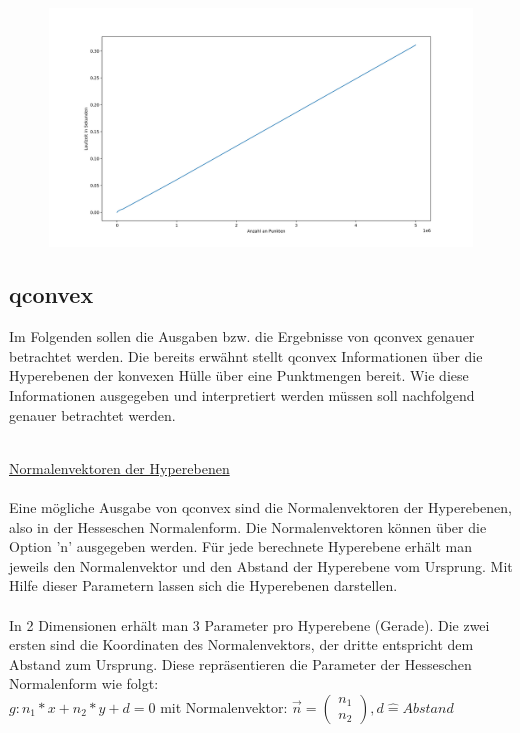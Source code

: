 \documentclass[12pt]{scrartcl}
\begin{document}
\begin{figure}[H]
    \centering
    \includegraphics[scale=0.32]{runtimes2.png}
\end{figure}

\newpage

\subsection{qconvex}
Im Folgenden sollen die Ausgaben bzw. die Ergebnisse von qconvex genauer betrachtet werden. Die bereits erwähnt stellt qconvex Informationen über die Hyperebenen der konvexen Hülle über eine Punktmengen bereit. Wie diese Informationen ausgegeben und interpretiert werden müssen soll nachfolgend genauer betrachtet werden.

\ \\
\underline{Normalenvektoren der Hyperebenen}\\~\\
Eine mögliche Ausgabe von qconvex sind die Normalenvektoren der Hyperebenen, also in der Hesseschen Normalenform. Die Normalenvektoren können über die Option 'n' ausgegeben werden. Für jede berechnete Hyperebene erhält man jeweils den Normalenvektor und den Abstand der Hyperebene vom Ursprung. Mit Hilfe dieser Parametern lassen sich die Hyperebenen darstellen.\\~\\

In 2 Dimensionen erhält man 3 Parameter pro Hyperebene (Gerade). Die zwei ersten sind die Koordinaten des Normalenvektors, der dritte entspricht dem Abstand zum Ursprung. Diese repräsentieren die Parameter der Hesseschen Normalenform wie folgt:\\

$ g: n_1*x+n_2*y+d = 0 $ mit Normalenvektor: $\vec{n} = \begin{pmatrix}n_1 \\ n_2\end{pmatrix}, d \widehat{=} Abstand$
\end{document}
